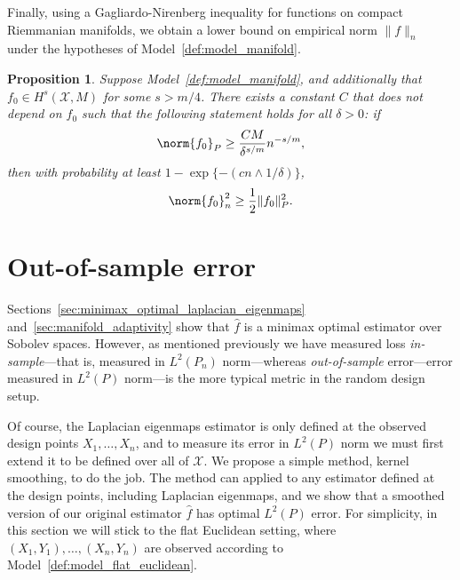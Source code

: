 \documentclass{article}
\newcommand{\1}{\mathbf{1}}
\newcommand{\Xset}{\mathcal{X}}
\newcommand{\Leb}{L}
\newcommand{\wh}[1]{\widehat{#1}}
\theoremstyle{alden}
\theoremstyle{aldenthm}
\newtheorem{proposition}{Proposition}
\theoremstyle{definition}
\theoremstyle{remark}
\begin{document}
Finally, using a Gagliardo-Nirenberg inequality for functions on compact Riemmanian manifolds, we obtain a lower bound on empirical norm $\|f\|_n$ under the hypotheses of Model~\ref{def:model_manifold}. 
\begin{proposition}
	\label{prop:empirical_norm_sobolev_manifold}
	Suppose Model~\ref{def:model_manifold}, and additionally that $f_0 \in H^s(\Xset,M)$ for some $s > m/4$. There exists a constant $C$ that does not depend on $f_0$ such that the following statement holds for all $\delta > 0$:  if
	\begin{equation}
	\label{eqn:empirical_norm_sobolev_manifold_1}
	\norm{f_0}_{P} \geq \frac{C M}{\delta^{s/m}}n^{-s/m},
	\end{equation}
	then with probability at least $1 - \exp\{-(cn \wedge 1/\delta)\}$,
	\begin{equation}
	\label{eqn:empirical_norm_sobolev_manifold}
	\norm{f_0}_n^2 \geq \frac{1}{2} \|f_0\|_P^2.
	\end{equation}
\end{proposition}

\section{Out-of-sample error}
\label{sec:out_of_sample}
Sections~\ref{sec:minimax_optimal_laplacian_eigenmaps} and~\ref{sec:manifold_adaptivity} show that $\wh{f}$ is a minimax optimal estimator over Sobolev spaces. However, as mentioned previously we have measured loss \emph{in-sample}---that is, measured in $\Leb^2(P_n)$ norm---whereas \emph{out-of-sample} error---error measured in $L^2(P)$ norm---is the more typical metric in the random design setup.

Of course, the Laplacian eigenmaps estimator is only defined at the observed design points $X_1,\ldots,X_n$, and to measure its error in $L^2(P)$ norm we must first extend it to be defined over all of $\Xset$. We propose a simple method, kernel smoothing, to do the job. The method can applied to any estimator defined at the design points, including Laplacian eigenmaps, and we show that a smoothed version of our original estimator $\wh{f}$ has optimal $L^2(P)$ error. For simplicity, in this section we will stick to the flat Euclidean setting, where $(X_1,Y_1),\ldots,(X_n,Y_n)$ are observed according to Model~\ref{def:model_flat_euclidean}.
\end{document}

